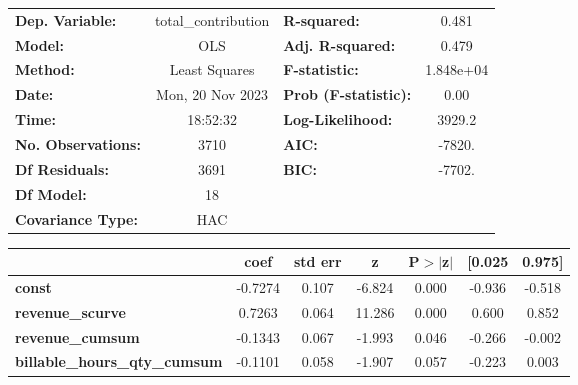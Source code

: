 \begin{center}
\begin{tabular}{lclc}
\toprule
\textbf{Dep. Variable:}                     & total\_contribution & \textbf{  R-squared:         } &     0.481   \\
\textbf{Model:}                             &         OLS         & \textbf{  Adj. R-squared:    } &     0.479   \\
\textbf{Method:}                            &    Least Squares    & \textbf{  F-statistic:       } & 1.848e+04   \\
\textbf{Date:}                              &   Mon, 20 Nov 2023  & \textbf{  Prob (F-statistic):} &     0.00    \\
\textbf{Time:}                              &       18:52:32      & \textbf{  Log-Likelihood:    } &    3929.2   \\
\textbf{No. Observations:}                  &          3710       & \textbf{  AIC:               } &    -7820.   \\
\textbf{Df Residuals:}                      &          3691       & \textbf{  BIC:               } &    -7702.   \\
\textbf{Df Model:}                          &            18       & \textbf{                     } &             \\
\textbf{Covariance Type:}                   &         HAC         & \textbf{                     } &             \\
\bottomrule
\end{tabular}
\begin{tabular}{lcccccc}
                                            & \textbf{coef} & \textbf{std err} & \textbf{z} & \textbf{P$> |$z$|$} & \textbf{[0.025} & \textbf{0.975]}  \\
\midrule
\textbf{const}                              &      -0.7274  &        0.107     &    -6.824  &         0.000        &       -0.936    &       -0.518     \\
\textbf{revenue\_scurve}                    &       0.7263  &        0.064     &    11.286  &         0.000        &        0.600    &        0.852     \\
\textbf{revenue\_cumsum}                    &      -0.1343  &        0.067     &    -1.993  &         0.046        &       -0.266    &       -0.002     \\
\textbf{billable\_hours\_qty\_cumsum}       &      -0.1101  &        0.058     &    -1.907  &         0.057        &       -0.223    &        0.003     \\

\end{tabular}
\end{center}
